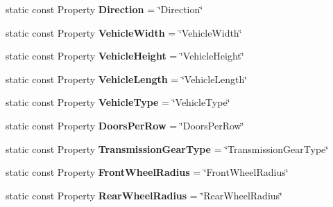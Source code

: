 \begin{DoxyCompactItemize}
\item 
\hypertarget{classVehicleProperty_a89d7508f610bdbbeaaec742ee3d4f656}{static const Property {\bfseries Direction} = \char`\"{}Direction\char`\"{}}\label{classVehicleProperty_a89d7508f610bdbbeaaec742ee3d4f656}

\item 
\hypertarget{classVehicleProperty_a4e3c78c74cee15e4f0c8b5f1c11215e7}{static const Property {\bfseries Vehicle\+Width} = \char`\"{}Vehicle\+Width\char`\"{}}\label{classVehicleProperty_a4e3c78c74cee15e4f0c8b5f1c11215e7}

\item 
\hypertarget{classVehicleProperty_a0fde8e98bbffe557982301ecfbe595b1}{static const Property {\bfseries Vehicle\+Height} = \char`\"{}Vehicle\+Height\char`\"{}}\label{classVehicleProperty_a0fde8e98bbffe557982301ecfbe595b1}

\item 
\hypertarget{classVehicleProperty_a9f2d02d1ff69cf8547c6bf8b4ab20a93}{static const Property {\bfseries Vehicle\+Length} = \char`\"{}Vehicle\+Length\char`\"{}}\label{classVehicleProperty_a9f2d02d1ff69cf8547c6bf8b4ab20a93}

\item 
\hypertarget{classVehicleProperty_a5f6f4c19869a4d6307a38bbcb14f3325}{static const Property {\bfseries Vehicle\+Type} = \char`\"{}Vehicle\+Type\char`\"{}}\label{classVehicleProperty_a5f6f4c19869a4d6307a38bbcb14f3325}

\item 
\hypertarget{classVehicleProperty_a0818b919a2721ebc9242fe4fd62c1c06}{static const Property {\bfseries Doors\+Per\+Row} = \char`\"{}Doors\+Per\+Row\char`\"{}}\label{classVehicleProperty_a0818b919a2721ebc9242fe4fd62c1c06}

\item 
\hypertarget{classVehicleProperty_a1255b40637cabbcc28901a9ca5efce8c}{static const Property {\bfseries Transmission\+Gear\+Type} = \char`\"{}Transmission\+Gear\+Type\char`\"{}}\label{classVehicleProperty_a1255b40637cabbcc28901a9ca5efce8c}

\item 
\hypertarget{classVehicleProperty_a61603d2610548667c65b21e2e5dc146b}{static const Property {\bfseries Front\+Wheel\+Radius} = \char`\"{}Front\+Wheel\+Radius\char`\"{}}\label{classVehicleProperty_a61603d2610548667c65b21e2e5dc146b}

\item 
\hypertarget{classVehicleProperty_a7317a413f21ad1c44667ada3883be9e6}{static const Property {\bfseries Rear\+Wheel\+Radius} = \char`\"{}Rear\+Wheel\+Radius\char`\"{}}\label{classVehicleProperty_a7317a413f21ad1c44667ada3883be9e6}


\end{DoxyCompactItemize}
